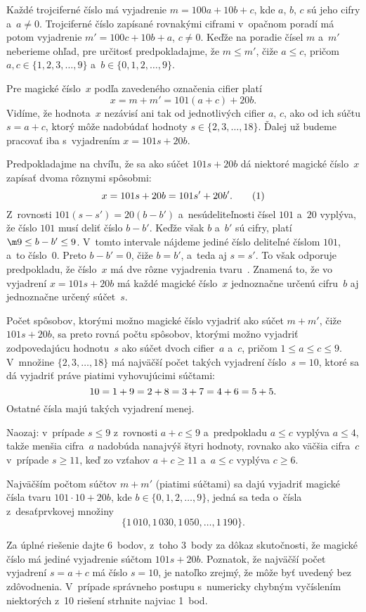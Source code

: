 {%
Každé trojciferné číslo má vyjadrenie $m=100a+10b+c$, kde $a$, $b$, $c$ sú jeho cifry a~$a\ne0$. Trojciferné číslo zapísané rovnakými ciframi v~opačnom poradí má potom vyjadrenie $m'=100c+10b+a$, $c\ne0$.
Keďže na poradie čísel $m$ a~$m'$ neberieme ohľad, pre určitosť predpokladajme, že $m\le m'$, čiže $a\le c$, pričom
$a,c\in\{1,2,3,\dots,9\}$ a~$b\in\{0,1,2,\dots,9\}$.

Pre magické číslo~$x$ podľa zavedeného označenia cifier platí
$$
x=m+m'=101(a+c)+20b.
$$
Vidíme, že hodnota~$x$ nezávisí ani tak od jednotlivých cifier $a$, $c$, ako od ich súčtu $s=a+c$, ktorý môže nadobúdať hodnoty $s\in\{2,3,\dots,18\}$. Ďalej už budeme pracovať iba s~vyjadrením $x=101s+20b$.

Predpokladajme na chvíľu, že sa ako súčet $101s+20b$ dá niektoré magické číslo~$x$ zapísať dvoma rôznymi spôsobmi:
$$
x=101s+20b=101s'+20b'.    \tag1
$$
Z~rovnosti $101(s-s')=20(b-b')$ a~nesúdeliteľnosti čísel $101$ a~$20$ vyplýva, že číslo $101$ musí deliť číslo $b-b'$. Keďže však $b$ a~$b'$ sú cifry, platí $\m9\le b-b'\le9$. V~tomto intervale nájdeme jediné číslo deliteľné číslom $101$,
a~to číslo~$0$. Preto $b-b'=0$, čiže $b=b'$, a~teda aj $s=s'$. To však odporuje predpokladu, že číslo~$x$ má dve rôzne vyjadrenia tvaru~. Znamená to, že vo vyjadrení $x=101s+20b$ má každé magické číslo~$x$ jednoznačne určenú cifru~$b$ aj jednoznačne určený súčet~$s$.

Počet spôsobov, ktorými možno magické číslo vyjadriť ako súčet $m+m'$, čiže $101s+20b$, sa preto rovná počtu spôsobov, ktorými možno vyjadriť zodpovedajúcu hodnotu~$s$ ako súčet dvoch cifier~$a$ a~$c$, pričom $1\le a\le c\le 9$. V~množine $\{2,3,\dots,18\}$
má najväčší počet takých vyjadrení
číslo~$s=10$, ktoré sa dá vyjadriť práve piatimi vyhovujúcimi súčtami:
$$
\postdisplaypenalty 10000
10=1+9=2+8=3+7=4+6=5+5.
$$
Ostatné čísla majú takých vyjadrení menej.

Naozaj: v~prípade $s\le9$ z~rovnosti $a+c\le9$ a~predpokladu $a\le c$ vyplýva $a\le4$, takže menšia cifra~$a$ nadobúda nanajvýš štyri hodnoty, rovnako ako väčšia cifra~$c$ v~prípade $s\ge11$, keď zo vzťahov $a+c\ge11$ a~$a\le c$ vyplýva $c\ge6$.

Najväčším počtom súčtov $m+m'$ (piatimi súčtami) sa dajú vyjadriť magické čísla tvaru $101\cdot10+20b$, kde $b\in\{0,1,2,\dots,9\}$, jedná sa teda o~čísla z~desaťprvkovej množiny
$$
\{1\,010,1\,030,1\,050,\dots,1\,190\}.
$$

\nobreak\medskip\petit\noindent
Za úplné riešenie dajte 6~bodov, z~toho 3~body za dôkaz skutočnosti, že magické číslo má jediné vyjadrenie súčtom
$101s+20b$. Poznatok, že najväčší počet vyjadrení $s=a+c$ má číslo $s=10$, je natoľko zrejmý, že môže byť uvedený bez zdôvodnenia. V~prípade správneho postupu s~numericky chybným vyčíslením niektorých z~10 riešení strhnite najviac
1~bod.

\endpetit
\bigbreak}


